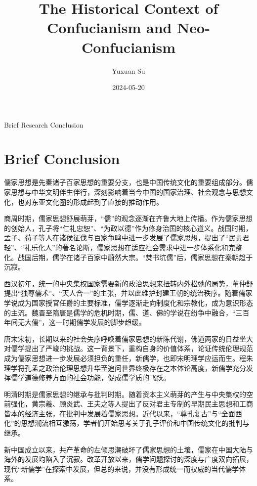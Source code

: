 \documentclass[
]{book}
\title{The Historical Context of Confucianism and Neo-Confucianism}
\author{Yuxuan Su}
\date{2024-05-20}
\begin{document}
\maketitle

{
\setcounter{tocdepth}{1}
\tableofcontents
}
Brief Research Conclusion

\hypertarget{brief-conclusion}{%
\chapter{Brief Conclusion}\label{brief-conclusion}}

儒家思想是先秦诸子百家思想的重要分支，也是中国传统文化的重要组成部分。儒家思想与中华文明伴生伴行，深刻影响着当今中国的国家治理、社会观念与思想文化，也对东亚文化圈的形成起到了直接的推动作用。

商周时期，儒家思想舒展萌芽，``儒''的观念逐渐在齐鲁大地上传播。作为儒家思想的创始人，孔子将``仁礼忠恕''、``为政以德''作为修身治国的核心道义。战国时期，孟子、荀子等人在诸侯征伐与百家争鸣中进一步发展了儒家思想，提出了``民贵君轻''、``礼乐化人''的著名论断，儒家思想在适应社会需求中进一步体系化和完整化。战国后期，儒学在诸子百家中蔚然大宗。``焚书坑儒''后，儒家思想在秦朝趋于沉寂。

西汉初年，统一的中央集权国家需要新的政治思想来扭转内外松弛的局势，董仲舒提出``独尊儒术''、``天人合一''的主张，并以此维护封建王朝的统治秩序。随着儒家学说成为国家授官任爵的主要标准，儒学逐渐走向制度化和宗教化，成为意识形态的主流。魏晋至隋唐是儒学的危机时期，儒、道、佛的学说在纷争中融合，``三百年间无大儒''，这一时期儒学发展的脚步趋缓。

唐末宋初，长期以来的社会失序呼唤着儒家思想的新陈代谢，佛道两家的日益坐大对儒学提出了严峻的挑战。这一背景下，重构自身的价值体系，论证传统伦理规范成为儒家思想进一步发展必须担负的重任，新儒学，也即宋明理学应运而生。程朱理学将孔孟之政治伦理思想升华至追问世界终极存在之本体论高度，新儒学充分发挥儒学道德修养方面的社会功能，促成儒学质的飞跃。

明清时期是儒家思想的继承与批判时期。随着资本主义萌芽的产生与中央集权的空前强化，黄宗羲、顾炎武、王夫之等人提出了反对君主专制的早期民主思想和工商皆本的经济主张，在批判中发展着儒家思想。近代以来，``尊孔复古''与``全面西化''的思想潮流相互激荡，学者们开始思考关于孔子评价和中国传统文化的批判与继承。

新中国成立以来，共产革命的左倾思潮破坏了儒家思想的土壤，儒家在中国大陆与海外的发展均陷入了沉寂。改革开放以来，儒学问题探讨的深度与广度双向拓展，现代``新儒学''在探索中发展，但总的来说，并没有形成统一而权威的当代儒学体系。
\end{document}
